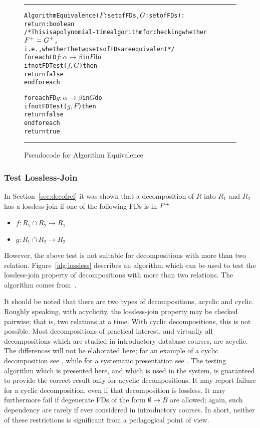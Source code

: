 \begin{figure}[htbp]
\hrule
\vspace{0.25cm}
\begin{alltt}
Algorithm Equivalence(\(F\): set of FDs, \(G\): set of FDs):
            return: boolean
/* This is a polynomial-time algorithm for checking whether \(F\sp{+} = G\sp{+}\), 
  i.e., whether the two sets of FDs are equivalent */ 
  foreach FD \(f : \alpha \rightarrow \beta\) in \(F\) do
    if not FDTest(\(f, G\)) then
      return false
  end foreach
  
  foreach FD \(g : \alpha \rightarrow \beta\) in \(G\) do
    if not FDTest(\(g, F\)) then
      return false
  end foreach
  return true
\end{alltt}
\caption{Pseudocode for Algorithm Equivalence}\label{alg:equivalence}
\hrule
\end{figure}

\subsubsection{Test Lossless-Join}
In Section~\ref{sec:decofrel} it was shown that a decomposition of $R$ into $R_1$ and $R_2$ 
has a lossless-join if one of the following FDs is in $F\sp{+}$
\begin{itemize}
  \item $f : R_1 \cap R_2 \rightarrow R_1$ 
  \item $g : R_1 \cap R_2 \rightarrow R_2$ 
\end{itemize}

However, the above test is not suitable for decompositions with more than two relation. 
Figure~\ref{alg:lossless} describes an algorithm which can be used to test
the lossless-join property of decompositions with more than two relations. The algorithm comes 
from~\cite[Algorithm 11.1]{bdb1}.

It should be noted that there are two types of decompositions, acyclic and cyclic.
Roughly speaking, with acyclicity, the lossless-join property may be
checked pairwise; that is, two relations at a time.  With cyclic
decompositions, this is not possible.  Most decompositions of
practical interest, and virtually all decompositions which are studied
in introductory database courses, are acyclic.  The differences will
not be elaborated here; for an example of a cyclic decomposition see
\cite[Section 7]{AhoBU79}, while for a systematic presentation see
\cite{BeeriFMY83}. The testing algorithm which is presented here,
and which is used in the system, is guaranteed to provide the correct
result only for acyclic decompositions. It may report failure for a
cyclic decomposition, even if that decomposition is lossless.  It may
furthermore fail if degenerate FDs of the form
 $\emptyset \rightarrow B$ are allowed; again, such dependency are
rarely if ever considered in introductory courses. In short, neither
of these restrictions is significant from a pedagogical point of view.

